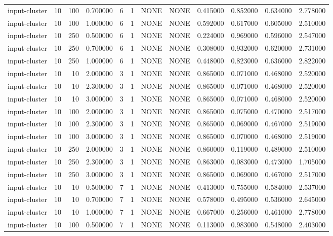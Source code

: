 \begin{tabular}{lrrrllllrrrr}
input-cluster & 10 & 100 & 0.700000 & 6 & 1 & NONE & NONE & 0.415000 & 0.852000 & 0.634000 & 2.778000 \\
input-cluster & 10 & 100 & 1.000000 & 6 & 1 & NONE & NONE & 0.592000 & 0.617000 & 0.605000 & 2.510000 \\
input-cluster & 10 & 250 & 0.500000 & 6 & 1 & NONE & NONE & 0.224000 & 0.969000 & 0.596000 & 2.547000 \\
input-cluster & 10 & 250 & 0.700000 & 6 & 1 & NONE & NONE & 0.308000 & 0.932000 & 0.620000 & 2.731000 \\
input-cluster & 10 & 250 & 1.000000 & 6 & 1 & NONE & NONE & 0.448000 & 0.823000 & 0.636000 & 2.822000 \\
input-cluster & 10 & 10 & 2.000000 & 3 & 1 & NONE & NONE & 0.865000 & 0.071000 & 0.468000 & 2.520000 \\
input-cluster & 10 & 10 & 2.300000 & 3 & 1 & NONE & NONE & 0.865000 & 0.071000 & 0.468000 & 2.520000 \\
input-cluster & 10 & 10 & 3.000000 & 3 & 1 & NONE & NONE & 0.865000 & 0.071000 & 0.468000 & 2.520000 \\
input-cluster & 10 & 100 & 2.000000 & 3 & 1 & NONE & NONE & 0.865000 & 0.075000 & 0.470000 & 2.517000 \\
input-cluster & 10 & 100 & 2.300000 & 3 & 1 & NONE & NONE & 0.865000 & 0.069000 & 0.467000 & 2.519000 \\
input-cluster & 10 & 100 & 3.000000 & 3 & 1 & NONE & NONE & 0.865000 & 0.070000 & 0.468000 & 2.519000 \\
input-cluster & 10 & 250 & 2.000000 & 3 & 1 & NONE & NONE & 0.860000 & 0.119000 & 0.489000 & 2.510000 \\
input-cluster & 10 & 250 & 2.300000 & 3 & 1 & NONE & NONE & 0.863000 & 0.083000 & 0.473000 & 1.705000 \\
input-cluster & 10 & 250 & 3.000000 & 3 & 1 & NONE & NONE & 0.865000 & 0.069000 & 0.467000 & 2.517000 \\
input-cluster & 10 & 10 & 0.500000 & 7 & 1 & NONE & NONE & 0.413000 & 0.755000 & 0.584000 & 2.537000 \\
input-cluster & 10 & 10 & 0.700000 & 7 & 1 & NONE & NONE & 0.578000 & 0.495000 & 0.536000 & 2.645000 \\
input-cluster & 10 & 10 & 1.000000 & 7 & 1 & NONE & NONE & 0.667000 & 0.256000 & 0.461000 & 2.778000 \\
input-cluster & 10 & 100 & 0.500000 & 7 & 1 & NONE & NONE & 0.113000 & 0.983000 & 0.548000 & 2.403000 \\

\end{tabular}
